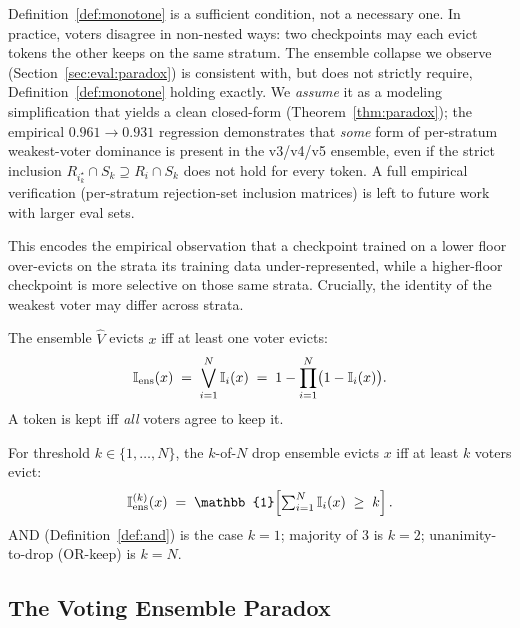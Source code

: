 \begin{remark}
Definition~\ref{def:monotone} is a sufficient condition, not a necessary one.
In practice, voters disagree in non-nested ways: two checkpoints may each
evict tokens the other keeps on the same stratum. The ensemble collapse we
observe (Section~\ref{sec:eval:paradox}) is consistent with, but does not
strictly require, Definition~\ref{def:monotone} holding exactly. We
\emph{assume} it as a modeling simplification that yields a clean closed-form
(Theorem~\ref{thm:paradox}); the empirical $0.961\to0.931$ regression
demonstrates that \emph{some} form of per-stratum weakest-voter dominance
is present in the v3/v4/v5 ensemble, even if the strict inclusion
$R_{i^{\star}_k}\cap S_k \supseteq R_i\cap S_k$ does not hold for every
token. A full empirical verification (per-stratum rejection-set inclusion
matrices) is left to future work with larger eval sets.
\end{remark}

This encodes the empirical observation that a checkpoint trained on a lower
floor over-evicts on the strata its training data under-represented, while a
higher-floor checkpoint is more selective on those same strata. Crucially, the
identity of the weakest voter may differ across strata.

\begin{definition}
\label{def:and}
The ensemble $\hat V$ evicts $x$ iff at least one voter evicts:
\[
  \mathbb{I}_{\mathrm{ens}}(x)
  \;=\; \bigvee_{i=1}^{N} \mathbb{I}_i(x)
  \;=\; 1 - \prod_{i=1}^{N}\bigl(1-\mathbb{I}_i(x)\bigr).
\]
A token is kept iff \emph{all} voters agree to keep it.
\end{definition}

\begin{definition}
\label{def:kofn}
For threshold $k\in\{1,\dots,N\}$, the $k$-of-$N$ drop ensemble evicts $x$ iff
at least $k$ voters evict:
\[
  \I_{\mathrm{ens}}^{(k)}(x)
  \;=\; \mathbb{1}\!\left[\textstyle\sum_{i=1}^{N} \I_i(x) \;\ge\; k\right].
\]
AND (Definition~\ref{def:and}) is the case $k{=}1$; majority of $3$ is $k{=}2$;
unanimity-to-drop (OR-keep) is $k{=}N$.
\end{definition}

\subsection{The Voting Ensemble Paradox}
\label{sec:paradox}

